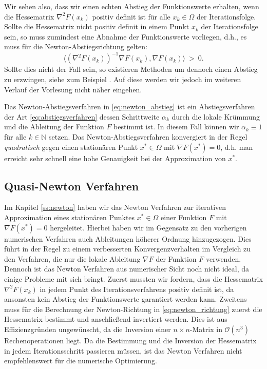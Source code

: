 Wir sehen also, dass wir einen echten Abstieg der Funktionswerte erhalten, wenn die Hessematrix $\nabla^2 F(x_k)$ positiv definit ist für alle $x_k \in \Omega$ der Iterationsfolge. 
Sollte die Hessematrix nicht positiv definit in einem Punkt $x_k$ der Iterationsfolge sein, so muss zumindest eine Abnahme der Funktionswerte vorliegen, d.h., es muss für die Newton-Abstiegsrichtung gelten:
\begin{equation*}
\langle (\nabla^2F(x_k))^{-1} \nabla F(x_k), \nabla F(x_k) \rangle \ > \ 0.
\end{equation*}
Sollte dies nicht der Fall sein, so existieren Methoden um dennoch einen Abstieg zu erzwingen, siehe zum Beispiel \cite[Kapitel 6]{nocedal_1999}. Auf diese werden wir jedoch im weiteren Verlauf der Vorlesung nicht näher eingehen.
\begin{remark}{}{}
Das Newton-Abstiegsverfahren in \eqref{eq:newton_abstieg} ist ein Abstiegsverfahren der Art \eqref{eq:abstiegsverfahren} dessen Schrittweite $\alpha_k$ durch die lokale Krümmung und die Ableitung der Funktion $F$ bestimmt ist. In diesem Fall können wir $\alpha_k \equiv 1$ für alle $k \in \mathbb{N}$ setzen.
Das Newton-Abstiegsverfahren konvergiert in der Regel \emph{quadratisch} gegen einen stationären Punkt $x^* \in \Omega$ mit $\nabla F(x^*)=0$, d.h. man erreicht sehr schnell eine hohe Genauigkeit bei der Approximation von $x^*$.
\end{remark}

\subsection{Quasi-Newton Verfahren}
\label{ss:quasi-newton}
Im Kapitel \ref{ss:newton} haben wir das Newton Verfahren zur iterativen Approximation eines stationären Punktes $x^* \in \Omega$ einer Funktion $F$ mit $\nabla F(x^*) = 0$ hergeleitet. 
Hierbei haben wir im Gegensatz zu den vorherigen numerischen Verfahren auch Ableitungen höherer Ordnung hinzugezogen. 
Dies führt in der Regel zu einem verbesserten Konvergenzverhalten im Vergleich zu den Verfahren, die nur die lokale Ableitung $\nabla F$ der Funktion $F$ verwenden.
Dennoch ist das Newton Verfahren aus numerischer Sicht noch nicht ideal, da einige Probleme mit sich bringt.
Zuerst mussten wir fordern, dass die Hessematrix $\nabla^2 F(x_k)$ in jedem Punkt des Iterationsverfahrens positiv definit ist, da ansonsten kein Abstieg der Funktionswerte garantiert werden kann.
Zweitens muss für die Berechnung der Newton-Richtung in \eqref{eq:newton_richtung} zuerst die Hessematrix bestimmt und anschließend invertiert werden.
Dies ist aus Effizienzgründen ungewünscht, da die Inversion einer $n \times n$-Matrix in $\mathcal{O}(n^3)$ Rechenoperationen liegt.
Da die Bestimmung und die Inversion der Hessematrix in jedem Iterationsschritt passieren müssen, ist das Newton Verfahren nicht empfehlenswert für die numerische Optimierung.

